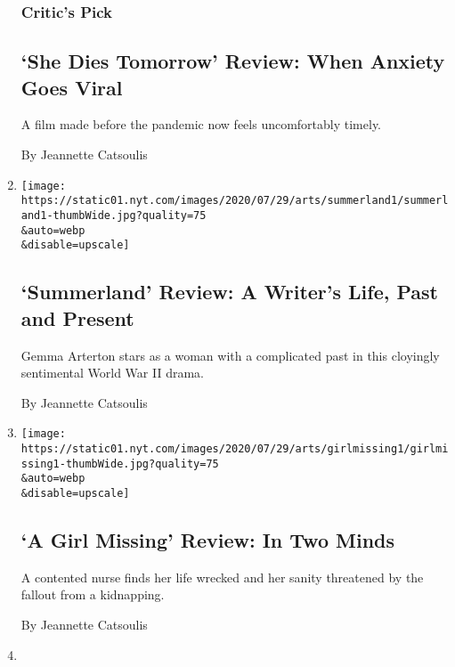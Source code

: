 \begin{enumerate}
  \hypertarget{critics-pick-1}{%
  \subsubsection{Critic's Pick}\label{critics-pick-1}}

  \hypertarget{she-dies-tomorrow-review-when-anxiety-goes-viral}{%
  \subsection{`She Dies Tomorrow' Review: When Anxiety Goes
  Viral}\label{she-dies-tomorrow-review-when-anxiety-goes-viral}}

  A film made before the pandemic now feels uncomfortably timely.

  By Jeannette Catsoulis
\item
  \href{/2020/07/30/movies/summerland-review.html}{}

  \texttt{[image: https://static01.nyt.com/images/2020/07/29/arts/summerland1/summerland1-thumbWide.jpg?quality=75\\\&auto=webp\\\&disable=upscale]}

  \hypertarget{summerland-review-a-writers-life-past-and-present}{%
  \subsection{`Summerland' Review: A Writer's Life, Past and
  Present}\label{summerland-review-a-writers-life-past-and-present}}

  Gemma Arterton stars as a woman with a complicated past in this
  cloyingly sentimental World War II drama.

  By Jeannette Catsoulis
\item
  \href{/2020/07/30/movies/a-girl-missing-review.html}{}

  \texttt{[image: https://static01.nyt.com/images/2020/07/29/arts/girlmissing1/girlmissing1-thumbWide.jpg?quality=75\\\&auto=webp\\\&disable=upscale]}

  \hypertarget{a-girl-missing-review-in-two-minds}{%
  \subsection{`A Girl Missing' Review: In Two
  Minds}\label{a-girl-missing-review-in-two-minds}}

  A contented nurse finds her life wrecked and her sanity threatened by
  the fallout from a kidnapping.

  By Jeannette Catsoulis
\item
  \href{/2020/07/28/movies/nose-to-tail-review.html}{}


\end{enumerate}
